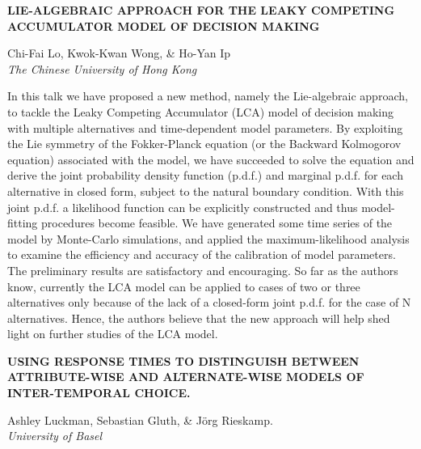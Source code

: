 \documentclass[]{article}
\begin{document}
\textbf{LIE-ALGEBRAIC APPROACH FOR THE LEAKY COMPETING ACCUMULATOR MODEL
OF DECISION MAKING}

Chi-Fai Lo, Kwok-Kwan Wong, \& Ho-Yan Ip\\
\emph{The Chinese University of Hong Kong}

In this talk we have proposed a new method, namely the Lie-algebraic
approach, to tackle the Leaky Competing Accumulator (LCA) model of
decision making with multiple alternatives and time-dependent model
parameters. By exploiting the Lie symmetry of the Fokker-Planck equation
(or the Backward Kolmogorov equation) associated with the model, we have
succeeded to solve the equation and derive the joint probability density
function (p.d.f.) and marginal p.d.f. for each alternative in closed
form, subject to the natural boundary condition. With this joint p.d.f.
a likelihood function can be explicitly constructed and thus
model-fitting procedures become feasible. We have generated some time
series of the model by Monte-Carlo simulations, and applied the
maximum-likelihood analysis to examine the efficiency and accuracy of
the calibration of model parameters. The preliminary results are
satisfactory and encouraging. So far as the authors know, currently the
LCA model can be applied to cases of two or three alternatives only
because of the lack of a closed-form joint p.d.f. for the case of N
alternatives. Hence, the authors believe that the new approach will help
shed light on further studies of the LCA model.\\
\pagebreak  

\textbf{USING RESPONSE TIMES TO DISTINGUISH BETWEEN ATTRIBUTE-WISE AND
ALTERNATE-WISE MODELS OF INTER-TEMPORAL CHOICE.}

Ashley Luckman, Sebastian Gluth, \& Jörg Rieskamp.\\
\emph{University of Basel}
\end{document}
